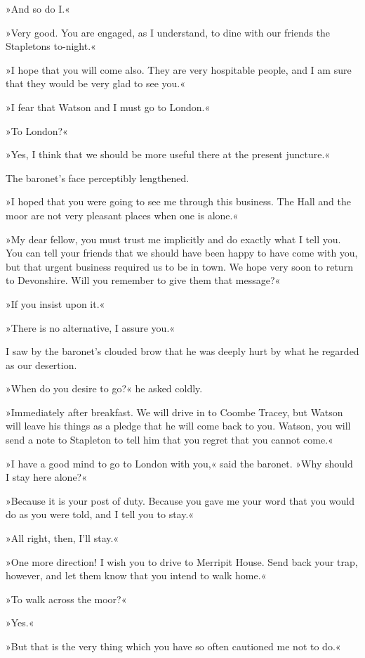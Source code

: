 »And so do I.«

»Very good. You are engaged, as I understand, to dine with our friends the Stapletons to-night.«

»I hope that you will come also. They are very hospitable people, and I am sure that they would be very glad to see you.«

»I fear that Watson and I must go to London.«

»To London?«

»Yes, I think that we should be more useful there at the present juncture.«

The baronet's face perceptibly lengthened.

»I hoped that you were going to see me through this business. The Hall and the moor are not very pleasant places when one is alone.«

»My dear fellow, you must trust me implicitly and do exactly what I tell you. You can tell your friends that we should have been happy to have come with you, but that urgent business required us to be in town. We hope very soon to return to Devonshire. Will you remember to give them that message?«

»If you insist upon it.«

»There is no alternative, I assure you.«

I saw by the baronet's clouded brow that he was deeply hurt by what he regarded as our desertion.

»When do you desire to go?« he asked coldly.

»Immediately after breakfast. We will drive in to Coombe Tracey, but Watson will leave his things as a pledge that he will come back to you. Watson, you will send a note to Stapleton to tell him that you regret that you cannot come.«

»I have a good mind to go to London with you,« said the baronet. »Why should I stay here alone?«

»Because it is your post of duty. Because you gave me your word that you would do as you were told, and I tell you to stay.«

»All right, then, I'll stay.«

»One more direction! I wish you to drive to Merripit House. Send back your trap, however, and let them know that you intend to walk home.«

»To walk across the moor?«

»Yes.«

»But that is the very thing which you have so often cautioned me not to do.«

